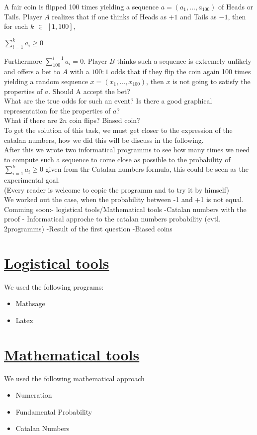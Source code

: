 \documentclass[a4paper,12pt,oneside]{article}
\begin{document}
\vspace{1cm}
A fair coin is flipped 100 times yielding a sequence $a=(a_{1},...,a_{100})$ of Heads or Tails. Player $A$ realizes that if one thinks of Heads as $+1$ and Tails as $-1$, then for each $k$ $\in$ $[1,100]$,
\begin{center}
$\sum_{i=1}^{k}a_{i}\geq0$
\end{center}
Furthermore $\sum_{100}^{i=1}a_{i}=0$. Player $B$ thinks such a sequence is extremely unlikely and offers a bet to $A$ with a $100:1$ odds that if they flip the coin again 100 times yielding a random sequence $x=(x_{1},...,x_{100})$, then $x$ is not going to satisfy the properties of $a$. Should A accept the bet? \\What are the true odds for such an event? Is there a good graphical representation for the properties of $a$?\\What if there are $2n$ coin flips? Biased coin?
\vspace{0.5cm}
\\
To get the solution of this task, we must get closer to the expression of the catalan numbers, how we did this will be discuss in the following.
\vspace{0.5cm}
\\
After this we wrote two informatical programms to see how many times we need to compute such a sequence to come close as possible to the probability of $\sum_{i=1}^{k}a_{i}\geq0$ given from thr Catalan numbers formula, this could be seen as the experimental goal.
\\
(Every reader is welcome to copie the programm and to try it by himself)
\\
We worked out the case, when the probability between -1 and +1 is not equal.
\newpage
Comming soon:- logistical tools/Mathematical tools -Catalan numbers with the proof - Informatical approche to the catalan numbers probability (evtl. 2programms) -Result of the first question -Biased coins 
\section{\underline{Logistical tools}}
We used the following programs:
\vspace{0,5cm}
\begin{itemize}
  \item Mathsage
	\item Latex
\end{itemize}
\vspace{2cm}
\section{\underline{Mathematical tools}}
We used the following mathematical approach
\vspace{0,5cm} 
\begin{itemize}  
  \item Numeration
  \item Fundamental Probability 
  \item Catalan Numbers
 \end{itemize}
\newpage
\end{document}

